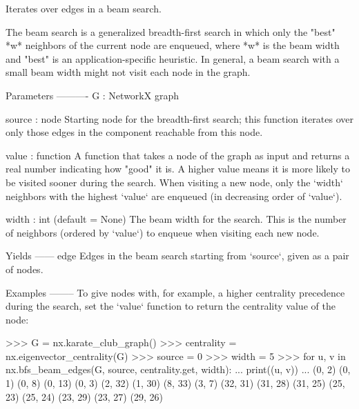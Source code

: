 \begin{DoxyVerb}Iterates over edges in a beam search.

The beam search is a generalized breadth-first search in which only
the "best" *w* neighbors of the current node are enqueued, where *w*
is the beam width and "best" is an application-specific
heuristic. In general, a beam search with a small beam width might
not visit each node in the graph.

Parameters
----------
G : NetworkX graph

source : node
    Starting node for the breadth-first search; this function
    iterates over only those edges in the component reachable from
    this node.

value : function
    A function that takes a node of the graph as input and returns a
    real number indicating how "good" it is. A higher value means it
    is more likely to be visited sooner during the search. When
    visiting a new node, only the `width` neighbors with the highest
    `value` are enqueued (in decreasing order of `value`).

width : int (default = None)
    The beam width for the search. This is the number of neighbors
    (ordered by `value`) to enqueue when visiting each new node.

Yields
------
edge
    Edges in the beam search starting from `source`, given as a pair
    of nodes.

Examples
--------
To give nodes with, for example, a higher centrality precedence
during the search, set the `value` function to return the centrality
value of the node:

>>> G = nx.karate_club_graph()
>>> centrality = nx.eigenvector_centrality(G)
>>> source = 0
>>> width = 5
>>> for u, v in nx.bfs_beam_edges(G, source, centrality.get, width):
...     print((u, v))
...
(0, 2)
(0, 1)
(0, 8)
(0, 13)
(0, 3)
(2, 32)
(1, 30)
(8, 33)
(3, 7)
(32, 31)
(31, 28)
(31, 25)
(25, 23)
(25, 24)
(23, 29)
(23, 27)
(29, 26)
\end{DoxyVerb}
 